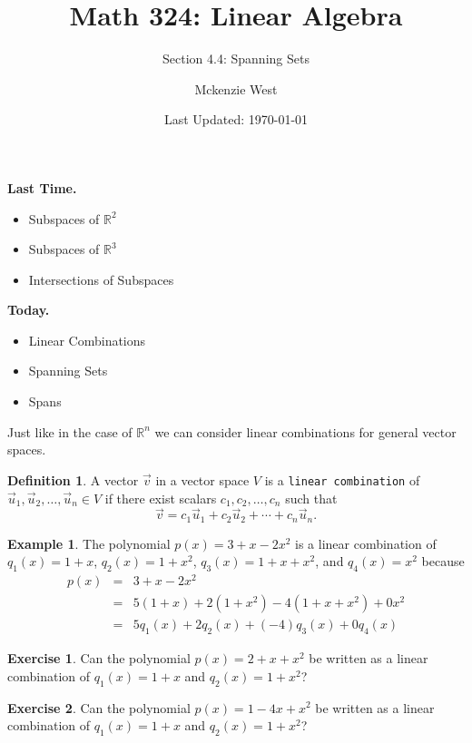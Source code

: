 \documentclass{beamer}
\newcommand{\R}{\mathbb{R}}
\newcommand{\fn}{\insertframenumber}
\theoremstyle{definition}
\newtheorem{exercise}{Exercise}
\newtheorem*{defn}{Definition}
\newtheorem*{exa}{Example}
\renewcommand{\emph}[1]{{\color{blue}\texttt{#1}}}
\begin{document}
	\title{Math 324: Linear Algebra}
	\subtitle{Section 4.4: Spanning Sets}
	\author{Mckenzie West}
	\date{Last Updated: \today}
\begin{frame}
\maketitle
\end{frame}

\begin{frame}{\insertframenumber}
	\begin{block}{\textbf{Last Time.}}
	\begin{itemize}[label=--]
		\item Subspaces of $\R^2$
		\item Subspaces of $\R^3$
		\item Intersections of Subspaces
	\end{itemize}
	\end{block}
	\begin{block}{\textbf{Today.}}
		\begin{itemize}[label=--]
			\item Linear Combinations
			\item Spanning Sets
			\item Spans
		\end{itemize}
	\end{block}
\end{frame}
\begin{frame}{\fn}
	Just like in the case of $\R^n$ we can consider linear combinations for general vector spaces.
	\begin{defn}
		A vector $\vec v$ in a vector space $V$ is a \emph{linear combination} of $\vec u_1,\vec u_2,\dots,\vec u_n\in V$ if there exist scalars $c_1,c_2,\dots,c_n$ such that
			\[\vec v=c_1\vec u_1+c_2\vec u_2+\cdots+c_n\vec u_n.\]
	\end{defn}
	\begin{exa}
		The polynomial $p(x)=3+x-2x^2$ is a linear combination of $q_1(x)=1+x$, $q_2(x)=1+x^2$, $q_3(x)=1+x+x^2$, and $q_4(x)=x^2$ because \begin{eqnarray*}p(x)&=&3+x-2x^2\\ &=&5(1+x)+2(1+x^2)-4(1+x+x^2)+0x^2\\&=&5q_1(x)+2q_2(x)+(-4)q_3(x)+0q_4(x)\end{eqnarray*}
	\end{exa}
\end{frame}
\begin{frame}{\fn}
	\begin{exercise}
		Can the polynomial $p(x)=2+x+x^2$ be written as a linear combination of $q_1(x)=1+x$ and $q_2(x)=1+x^2$?
	\end{exercise}
	\begin{exercise}
		Can the polynomial $p(x)=1-4x+x^2$ be written as a linear combination of $q_1(x)=1+x$ and $q_2(x)=1+x^2$?
	\end{exercise}
\end{frame}
\end{document}
